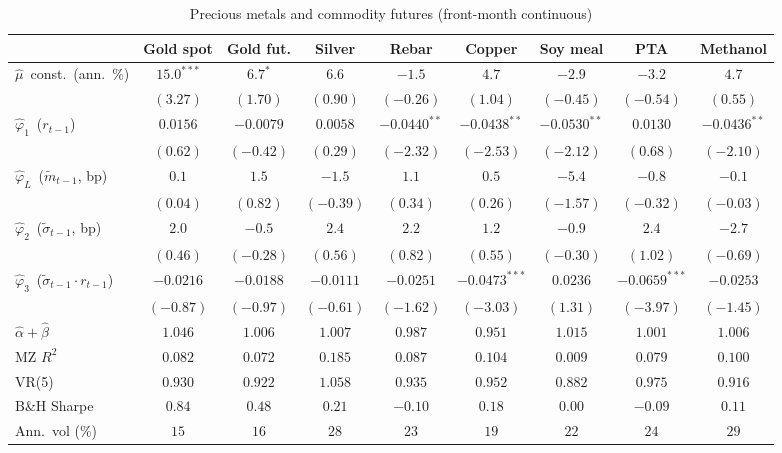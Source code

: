 \begin{table}[htbp]\centering
\caption{Precious metals and commodity futures (front-month continuous)}\label{tab:comm_en}
\footnotesize\setlength{\tabcolsep}{4pt}
\begin{threeparttable}
\begin{tabular}{lcccccccc}
\toprule
 & Gold spot & Gold fut. & Silver & Rebar & Copper & Soy meal & PTA & Methanol \\
\midrule
$\hat\mu$~const.\ (ann.\ \%) & $15.0^{***}$ & $6.7^{*}$ & $6.6$ & $-1.5$ & $4.7$ & $-2.9$ & $-3.2$ & $4.7$ \\
 & $(3.27)$ & $(1.70)$ & $(0.90)$ & $(-0.26)$ & $(1.04)$ & $(-0.45)$ & $(-0.54)$ & $(0.55)$ \\[2pt]
$\hat\varphi_1$~($r_{t-1}$) & $0.0156$ & $-0.0079$ & $0.0058$ & $-0.0440^{**}$ & $-0.0438^{**}$ & $-0.0530^{**}$ & $0.0130$ & $-0.0436^{**}$ \\
 & $(0.62)$ & $(-0.42)$ & $(0.29)$ & $(-2.32)$ & $(-2.53)$ & $(-2.12)$ & $(0.68)$ & $(-2.10)$ \\[2pt]
$\hat\varphi_L$~($\tilde m_{t-1}$, bp) & $0.1$ & $1.5$ & $-1.5$ & $1.1$ & $0.5$ & $-5.4$ & $-0.8$ & $-0.1$ \\
 & $(0.04)$ & $(0.82)$ & $(-0.39)$ & $(0.34)$ & $(0.26)$ & $(-1.57)$ & $(-0.32)$ & $(-0.03)$ \\[2pt]
$\hat\varphi_2$~($\tilde\sigma_{t-1}$, bp) & $2.0$ & $-0.5$ & $2.4$ & $2.2$ & $1.2$ & $-0.9$ & $2.4$ & $-2.7$ \\
 & $(0.46)$ & $(-0.28)$ & $(0.56)$ & $(0.82)$ & $(0.55)$ & $(-0.30)$ & $(1.02)$ & $(-0.69)$ \\[2pt]
$\hat\varphi_3$~($\tilde\sigma_{t-1}\!\cdot\! r_{t-1}$) & $-0.0216$ & $-0.0188$ & $-0.0111$ & $-0.0251$ & $-0.0473^{***}$ & $0.0236$ & $-0.0659^{***}$ & $-0.0253$ \\
 & $(-0.87)$ & $(-0.97)$ & $(-0.61)$ & $(-1.62)$ & $(-3.03)$ & $(1.31)$ & $(-3.97)$ & $(-1.45)$ \\[2pt]
\midrule
$\hat\alpha+\hat\beta$ & $1.046$ & $1.006$ & $1.007$ & $0.987$ & $0.951$ & $1.015$ & $1.001$ & $1.006$ \\
MZ $R^2$ & $0.082$ & $0.072$ & $0.185$ & $0.087$ & $0.104$ & $0.009$ & $0.079$ & $0.100$ \\
VR(5) & $0.930$ & $0.922$ & $1.058$ & $0.935$ & $0.952$ & $0.882$ & $0.975$ & $0.916$ \\
B\&H Sharpe & $0.84$ & $0.48$ & $0.21$ & $-0.10$ & $0.18$ & $0.00$ & $-0.09$ & $0.11$ \\
Ann.\ vol (\%) & $15$ & $16$ & $28$ & $23$ & $19$ & $22$ & $24$ & $29$ \\

\end{tabular}
\end{threeparttable}
\end{table}
